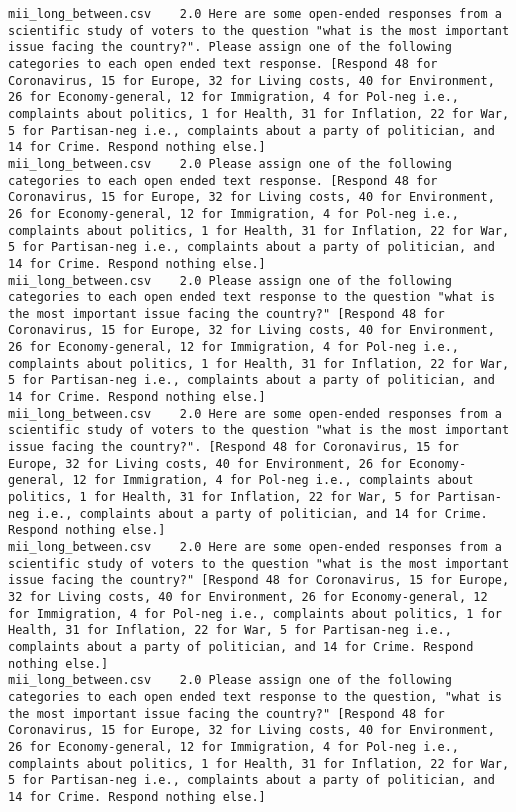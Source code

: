 \begin{lstlisting}
mii_long_between.csv	2.0	Here are some open-ended responses from a scientific study of voters to the question "what is the most important issue facing the country?". Please assign one of the following categories to each open ended text response. [Respond 48 for Coronavirus, 15 for Europe, 32 for Living costs, 40 for Environment, 26 for Economy-general, 12 for Immigration, 4 for Pol-neg i.e., complaints about politics, 1 for Health, 31 for Inflation, 22 for War, 5 for Partisan-neg i.e., complaints about a party of politician, and 14 for Crime. Respond nothing else.]
mii_long_between.csv	2.0	Please assign one of the following categories to each open ended text response. [Respond 48 for Coronavirus, 15 for Europe, 32 for Living costs, 40 for Environment, 26 for Economy-general, 12 for Immigration, 4 for Pol-neg i.e., complaints about politics, 1 for Health, 31 for Inflation, 22 for War, 5 for Partisan-neg i.e., complaints about a party of politician, and 14 for Crime. Respond nothing else.]
mii_long_between.csv	2.0	Please assign one of the following categories to each open ended text response to the question "what is the most important issue facing the country?" [Respond 48 for Coronavirus, 15 for Europe, 32 for Living costs, 40 for Environment, 26 for Economy-general, 12 for Immigration, 4 for Pol-neg i.e., complaints about politics, 1 for Health, 31 for Inflation, 22 for War, 5 for Partisan-neg i.e., complaints about a party of politician, and 14 for Crime. Respond nothing else.]
mii_long_between.csv	2.0	Here are some open-ended responses from a scientific study of voters to the question "what is the most important issue facing the country?". [Respond 48 for Coronavirus, 15 for Europe, 32 for Living costs, 40 for Environment, 26 for Economy-general, 12 for Immigration, 4 for Pol-neg i.e., complaints about politics, 1 for Health, 31 for Inflation, 22 for War, 5 for Partisan-neg i.e., complaints about a party of politician, and 14 for Crime. Respond nothing else.]
mii_long_between.csv	2.0	Here are some open-ended responses from a scientific study of voters to the question "what is the most important issue facing the country?" [Respond 48 for Coronavirus, 15 for Europe, 32 for Living costs, 40 for Environment, 26 for Economy-general, 12 for Immigration, 4 for Pol-neg i.e., complaints about politics, 1 for Health, 31 for Inflation, 22 for War, 5 for Partisan-neg i.e., complaints about a party of politician, and 14 for Crime. Respond nothing else.]
mii_long_between.csv	2.0	Please assign one of the following categories to each open ended text response to the question, "what is the most important issue facing the country?" [Respond 48 for Coronavirus, 15 for Europe, 32 for Living costs, 40 for Environment, 26 for Economy-general, 12 for Immigration, 4 for Pol-neg i.e., complaints about politics, 1 for Health, 31 for Inflation, 22 for War, 5 for Partisan-neg i.e., complaints about a party of politician, and 14 for Crime. Respond nothing else.]

\end{lstlisting}
